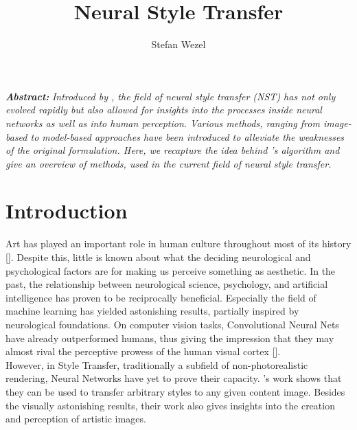 \documentclass{seminar}
\begin{document}
	\renewcommand\toptitle{Seminar: ,,Current Topics in Deep Neural Networks``}
	\title{Neural Style Transfer}
	\author{Stefan Wezel}
	\maketitle
	
	
	\addvspace{0.5cm}
	\emph{\bfseries{Abstract:}}
	\emph{Introduced by \cite{gatys2015neural}, the field of neural style transfer (NST) has not only evolved rapidly but also allowed for insights into the processes inside neural networks as well as into human perception. Various methods, ranging from image-based to model-based approaches have been introduced to alleviate the weaknesses of the original formulation. Here, we recapture the idea behind \cite{gatys2015neural}'s algorithm and give an overview of methods, used in the current field of neural style transfer.}
	
	
	\tableofcontents
	\newpage
	
	\section{Introduction}
	Art has played an important role in human culture throughout most of its history [\cite{carroll2004art}]. Despite this, little is known about what the deciding neurological and psychological factors are for making us perceive something as aesthetic.
	In the past, the relationship between neurological science, psychology, and artificial intelligence has proven to be reciprocally beneficial. Especially the field of machine learning has yielded astonishing results, partially inspired by neurological foundations.
	On computer vision tasks, Convolutional Neural Nets have already outperformed humans, thus giving the impression that they may almost rival the perceptive prowess of the human visual cortex [\cite{geirhos2017comparing}].\\
	However, in Style Transfer, traditionally a subfield of non-photorealistic rendering, Neural Networks have yet to prove their capacity.
	\cite{gatys2015neural}'s work shows that they can be used to transfer arbitrary styles to any given content image. Besides the visually astonishing results, their work also gives insights into the creation and perception of artistic images.
	
	
	
\end{document}
